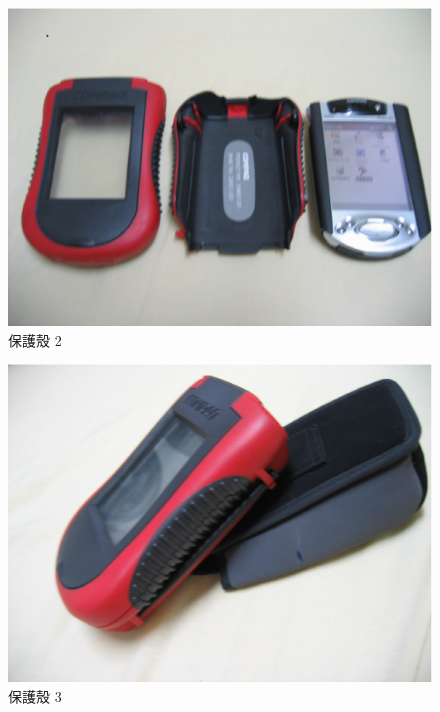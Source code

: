\documentclass[12pt,a4paper]{article}
\begin{document}
\begin{CJK}{UTF8}{bsmi}
\begin{figure}[htbp]
\centering
\includegraphics[scale=0.4]{eps/shell_2.eps}
\caption{保護殼 2}
\end{figure}

\begin{figure}[htbp]
\centering
\includegraphics[scale=0.3]{eps/shell_5.eps}
\caption{保護殼 3}
\end{figure}


\end{CJK}
\end{document}
